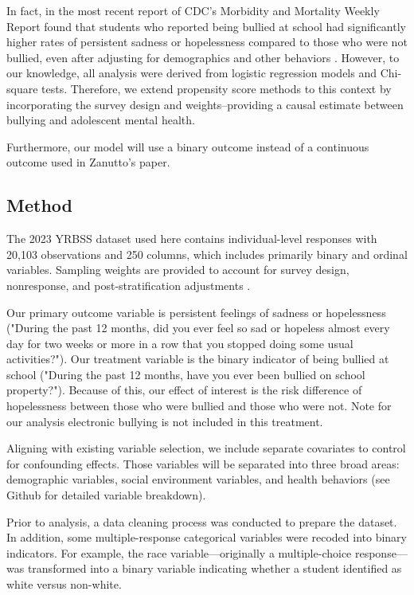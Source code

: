 \documentclass[12pt]{article}
\begin{document}
In fact, in the most recent report of CDC's Morbidity and Mortality Weekly Report found that students who reported being bullied at school had significantly higher rates of persistent sadness or hopelessness compared to those who were not bullied, even after adjusting for demographics and other behaviors \cite{cdc_mmwrr_2024}. However, to our knowledge, all analysis were derived from logistic regression models and Chi-square tests. Therefore, we extend propensity score methods to this context by incorporating the survey design and weights--providing a causal estimate between bullying and adolescent mental health.

Furthermore, our model will use a binary outcome instead of a continuous outcome used in Zanutto's paper.

\subsection{Method} \label{subsec:ExtMethod}

The 2023 YRBSS dataset used here contains individual-level responses with 20,103 observations and 250 columns, which includes primarily binary and ordinal variables. Sampling weights are provided to account for survey design, nonresponse, and post-stratification adjustments \cite{cdc_mmwrr_2024}.

Our primary outcome variable is persistent feelings of sadness or hopelessness ("During the past 12 months, did you ever feel so sad or hopeless almost every day for two weeks or more in a row that you stopped doing some usual activities?"). Our treatment variable is the binary indicator of being bullied at school ("During the past 12 months, have you ever been bullied on school property?"). Because of this, our effect of interest is the risk difference of hopelessness between those who were bullied and those who were not. Note for our analysis electronic bullying is not included in this treatment.

Aligning with existing variable selection, we include separate covariates to control for confounding effects. Those variables will be separated into three broad areas: demographic variables, social environment variables, and health behaviors (see Github for detailed variable breakdown).

Prior to analysis, a data cleaning process was conducted to prepare the dataset. In addition, some multiple-response categorical variables were recoded into binary indicators. For example, the race variable—originally a multiple-choice response—was transformed into a binary variable indicating whether a student identified as white versus non-white.
\end{document}
